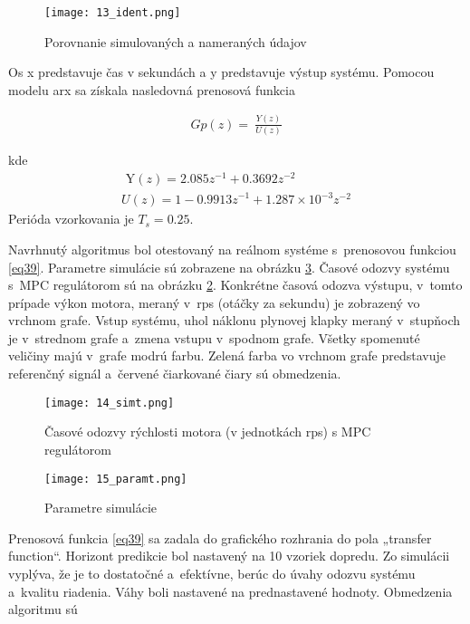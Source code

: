 \begin{figure}[!htbp]
\centering
\texttt{[image: 13\_ident.png]}
\caption{Porovnanie simulovaných a nameraných údajov}
\label{13_ident}
\end{figure}
Os x predstavuje čas v sekundách a y predstavuje výstup systému. Pomocou modelu arx sa získala nasledovná prenosová funkcia

\begin{equation} \label{eq38}
\begin{split}
Gp(z) = \ \frac{Y(z)}{U(z)}
\end{split}
\end{equation}

kde
\begin{equation} \label{eq39}
\begin{split}
\text{\ Y}\left( z \right) = 2.085z^{- 1} + 0.3692z^{- 2} \\
U\left( z \right) = 1 - 0.99{13z}^{- 1} + 1.287 \times 10^{- 3}z^{- 2}
\end{split}
\end{equation}
Perióda vzorkovania je \(T_{s} = 0.25\).

Navrhnutý algoritmus bol otestovaný na reálnom systéme s~prenosovou
funkciou \ref{eq39}. Parametre simulácie sú zobrazene na obrázku \ref{15_paramt}. Časové odozvy systému s~MPC regulátorom sú
na obrázku \ref{14_simt}. Konkrétne časová odozva výstupu, v~tomto prípade
výkon motora, meraný v~rps (otáčky za sekundu) je zobrazený vo vrchnom
grafe. Vstup systému, uhol náklonu plynovej klapky meraný v~stupňoch je
v~strednom grafe a~zmena vstupu v~spodnom grafe. Všetky spomenuté
veličiny majú v~grafe modrú farbu. Zelená farba vo vrchnom grafe
predstavuje referenčný signál a~červené čiarkované čiary sú obmedzenia.

\begin{figure}[!htbp]
\centering
\texttt{[image: 14\_simt.png]}
\caption{Časové odozvy rýchlosti motora (v jednotkách rps) s MPC regulátorom}
\label{14_simt}
\end{figure}

\begin{figure}[!htbp]
\centering
\texttt{[image: 15\_paramt.png]}
\caption{Parametre simulácie}
\label{15_paramt}
\end{figure}

Prenosová funkcia \ref{eq39} sa zadala do grafického rozhrania do pola
„transfer function``. Horizont predikcie bol nastavený na 10 vzoriek
dopredu. Zo simulácii vyplýva, že je to dostatočné a~efektívne, berúc do
úvahy odozvu systému a~kvalitu riadenia. Váhy boli nastavené na
prednastavené hodnoty. Obmedzenia algoritmu sú

